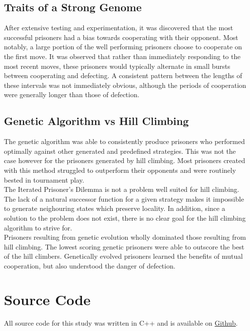 \documentclass[12pt]{article}
\begin{document}
\subsection{Traits of a Strong Genome}
After extensive testing and experimentation, it was discovered that the most successful prisoners
had a bias towards cooperating with their opponent. Most notably, a large portion of
the well performing prisoners choose to cooperate on the first move.
It was observed that rather than immediately responding to the most recent moves, these prisoners would
typically alternate in small bursts between cooperating and defecting. A consistent
pattern between the lengths of these intervals was not immediately obvious, although
the periods of cooperation were generally longer than those of defection.

\subsection{Genetic Algorithm vs Hill Climbing}
The genetic algorithm was able to consistently produce prisoners who performed
optimally against other generated and predefined strategies. This was not the
case however for the prisoners generated by hill climbing. Most prisoners created with this method struggled to outperform their opponents
and were routinely bested in tournament play. \\

The Iterated Prisoner's Dilemma is not a problem well suited for hill climbing.
The lack of a natural successor function for a given strategy makes it impossible
to generate neighouring states which preserve locality.  In addition, since
a solution to the problem does not exist, there is no clear goal for the hill climbing algorithm
to strive for. \\


Prisoners resulting from genetic evolution wholly dominated those resulting
from hill climbing.  The lowest scoring genetic prisoners were able to outscore
the best of the hill climbers.  Genetically evolved prisoners learned the benefits
of mutual cooperation, but also understood the danger of defection.

\pagebreak

\section{Source Code}
All source code for this study was written in C++ and is
available on
\href{https://github.com/Quinny/IteratedPrisoners}{Github}.
\end{document}
